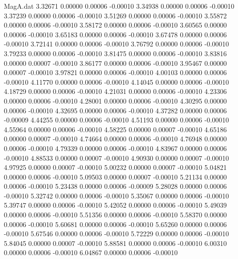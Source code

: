 \begin{filecontents}{MagA.dat}
   3.32671    0.00000    0.00006   -0.00010
   3.34938    0.00000    0.00006   -0.00010
   3.37239    0.00000    0.00006   -0.00010
   3.51269    0.00000    0.00006   -0.00010
   3.55872    0.00000    0.00006   -0.00010
   3.58172    0.00000    0.00006   -0.00010
   3.60565    0.00000    0.00006   -0.00010
   3.65183    0.00000    0.00006   -0.00010
   3.67478    0.00000    0.00006   -0.00010
   3.72141    0.00000    0.00006   -0.00010
   3.76792    0.00000    0.00006   -0.00010
   3.79233    0.00000    0.00006   -0.00010
   3.81475    0.00000    0.00006   -0.00010
   3.83816    0.00000    0.00007   -0.00010
   3.86177    0.00000    0.00006   -0.00010
   3.95467    0.00000    0.00007   -0.00010
   3.97821    0.00000    0.00006   -0.00010
   4.00103    0.00000    0.00006   -0.00010
   4.11770    0.00000    0.00006   -0.00010
   4.14045    0.00000    0.00006   -0.00010
   4.18729    0.00000    0.00006   -0.00010
   4.21031    0.00000    0.00006   -0.00010
   4.23306    0.00000    0.00006   -0.00010
   4.28001    0.00000    0.00006   -0.00010
   4.30295    0.00000    0.00006   -0.00010
   4.32695    0.00000    0.00006   -0.00010
   4.37282    0.00000    0.00006   -0.00009
   4.44255    0.00000    0.00006   -0.00010
   4.51193    0.00000    0.00006   -0.00010
   4.55964    0.00000    0.00006   -0.00010
   4.58225    0.00000    0.00007   -0.00010
   4.65186    0.00000    0.00007   -0.00010
   4.74664    0.00000    0.00006   -0.00010
   4.76948    0.00000    0.00006   -0.00010
   4.79339    0.00000    0.00006   -0.00010
   4.83967    0.00000    0.00006   -0.00010
   4.88533    0.00000    0.00007   -0.00010
   4.90930    0.00000    0.00007   -0.00010
   4.97925    0.00000    0.00007   -0.00010
   5.00232    0.00000    0.00007   -0.00010
   5.04821    0.00000    0.00006   -0.00010
   5.09503    0.00000    0.00007   -0.00010
   5.21134    0.00000    0.00006   -0.00010
   5.23438    0.00000    0.00006   -0.00009
   5.28028    0.00000    0.00006   -0.00010
   5.32742    0.00000    0.00006   -0.00010
   5.35067    0.00000    0.00006   -0.00010
   5.39747    0.00000    0.00006   -0.00010
   5.42052    0.00000    0.00006   -0.00010
   5.49039    0.00000    0.00006   -0.00010
   5.51356    0.00000    0.00006   -0.00010
   5.58370    0.00000    0.00006   -0.00010
   5.60681    0.00000    0.00006   -0.00010
   5.65260    0.00000    0.00006   -0.00010
   5.67546    0.00000    0.00006   -0.00010
   5.72229    0.00000    0.00006   -0.00010
   5.84045    0.00000    0.00007   -0.00010
   5.88581    0.00000    0.00006   -0.00010
   6.00310    0.00000    0.00006   -0.00010
   6.04867    0.00000    0.00006   -0.00010

\end{filecontents}
